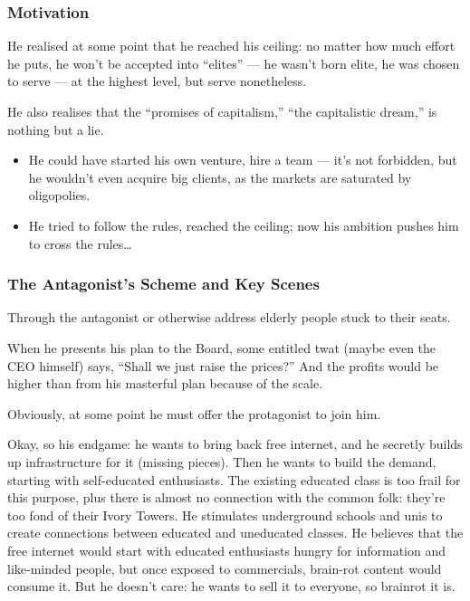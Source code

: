 \documentclass[12pt]{article}
\begin{document}
\subsubsection{Motivation}

He realised at some point that he reached his ceiling: no matter how much effort he puts, he won’t be accepted into “elites” — he wasn’t born elite, he was chosen to serve — at the highest level, but serve nonetheless.

He also realises that the “promises of capitalism,” “the capitalistic dream,” is nothing but a lie.

\begin{itemize}
  \item He could have started his own venture, hire a team — it’s not forbidden, but he wouldn’t even acquire big clients, as the markets are saturated by oligopolies.
  \item He tried to follow the rules, reached the ceiling; now his ambition pushes him to cross the rules…
\end{itemize}

\subsubsection{The Antagonist’s Scheme and Key Scenes}

Through the antagonist or otherwise address elderly people stuck to their seats.

When he presents his plan to the Board, some entitled twat (maybe even the CEO himself) says, “Shall we just raise the prices?” And the profits would be higher than from his masterful plan because of the scale.

Obviously, at some point he must offer the protagonist to join him.

Okay, so his endgame: he wants to bring back free internet, and he secretly builds up infrastructure for it (missing pieces). Then he wants to build the demand, starting with self-educated enthusiasts. The existing educated class is too frail for this purpose, plus there is almost no connection with the common folk: they're too fond of their Ivory Towers. He stimulates underground schools and unis to create connections between educated and uneducated classes. He believes that the free internet would start with educated enthusiasts hungry for information and like-minded people, but once exposed to commercials, brain-rot content would consume it. But he doesn’t care: he wants to sell it to everyone, so brainrot it is.
\end{document}
